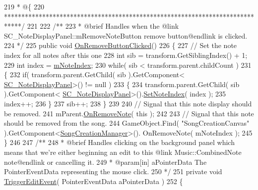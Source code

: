 \begin{DoxyCodeInclude}
219 \textcolor{comment}{    * @\{}
220 \textcolor{comment}{    *****************************************************************************/}
221 \textcolor{comment}{}
222 \textcolor{comment}{    /**}
223 \textcolor{comment}{     * @brief Handles when the @link SC\_NoteDisplayPanel::mRemoveNoteButton remove button@endlink is
       clicked.}
224 \textcolor{comment}{    */}
225     \textcolor{keyword}{public} \textcolor{keywordtype}{void} \hyperlink{group___s_c___n_d_p_handlers_ga0b545f6cd12ce56258842cb1036bceec}{OnRemoveButtonClicked}()
226     \{
227         \textcolor{comment}{// Set the note index for all notes after this one}
228         \textcolor{keywordtype}{int} sib = transform.GetSiblingIndex() + 1;
229         \textcolor{keywordtype}{int} index = \hyperlink{group___s_c___n_d_p_priv_var_ga11933919195aba904a4e8bf95f131e49}{mNoteIndex};
230         \textcolor{keywordflow}{while}( sib < transform.parent.childCount )
231         \{
232             \textcolor{keywordflow}{if}( transform.parent.GetChild( sib ).GetComponent<
      \hyperlink{class_s_c___note_display_panel}{SC\_NoteDisplayPanel}>() != null )
233             \{
234                 transform.parent.GetChild( sib ).GetComponent<
      \hyperlink{class_s_c___note_display_panel}{SC\_NoteDisplayPanel}>().\hyperlink{group___s_c___n_d_p_unity_gaf3160e3686e44e7718768242438ea1cc}{SetNoteIndex}( index );
235                 index++;
236             \}
237             sib++;
238         \}
239 
240         \textcolor{comment}{// Signal that this note display should be removed.}
241         mParent.\hyperlink{group___s_c___m_d_p_handlers_gab48fa7fe4d7d4b29a3b0567be2b29849}{OnRemoveNote}( \textcolor{keyword}{this} );
242 
243         \textcolor{comment}{// Signal that this note should be removed from the song.}
244         GameObject.Find( \textcolor{stringliteral}{"SongCreationCanvas"} ).GetComponent<\hyperlink{class_song_creation_manager}{SongCreationManager}>().
      OnRemoveNote( mNoteIndex );
245     \}
246 \textcolor{comment}{}
247 \textcolor{comment}{    /** }
248 \textcolor{comment}{     * @brief Handles clicking on the background panel which means that we're either beginning an edit to
       this @link Music::CombinedNote note@endlink or cancelling it.}
249 \textcolor{comment}{     * @param[in] aPointerData The PointerEventData representing the mouse click.}
250 \textcolor{comment}{    */}
251     \textcolor{keyword}{private} \textcolor{keywordtype}{void} \hyperlink{group___s_c___n_d_p_handlers_ga7b25bcc6b76ae0894ac6eefde417caf1}{TriggerEditEvent}( PointerEventData aPointerData )
252     \{

\end{DoxyCodeInclude}
